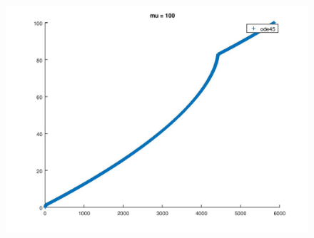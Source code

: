 \documentclass{article}
\begin{document}
	\begin{figure}[htp!]
		\centering 
		\includegraphics[width=\textwidth]{6_3_4_a.jpeg}
	\end{figure}
\end{document}
